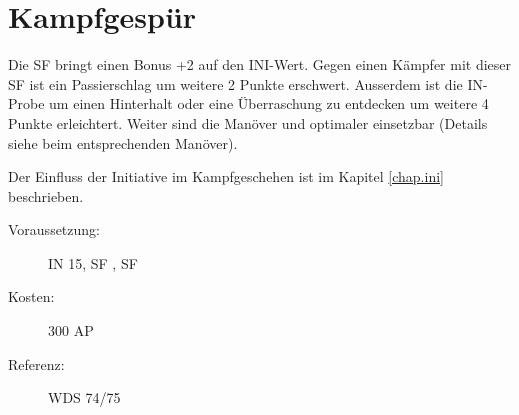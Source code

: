 \section{Kampfgespür}
\label{sf.kampfgespuer}
Die SF  bringt einen Bonus +2 auf den INI-Wert.
Gegen einen Kämpfer mit dieser SF ist ein Passierschlag um weitere 2 Punkte erschwert.
Ausserdem ist die IN-Probe um einen Hinterhalt oder eine Überraschung zu entdecken um weitere 4 Punkte erleichtert.
Weiter sind die Manöver  und  optimaler einsetzbar (Details siehe beim entsprechenden Manöver).

Der Einfluss der Initiative im Kampfgeschehen ist im Kapitel \ref{chap.ini} beschrieben.
\begin{description}
    \item[Voraussetzung:]
        IN 15, SF , SF 
    \item [Kosten:]
        300 AP
    \item [Referenz:]
        WDS 74/75
\end{description}
